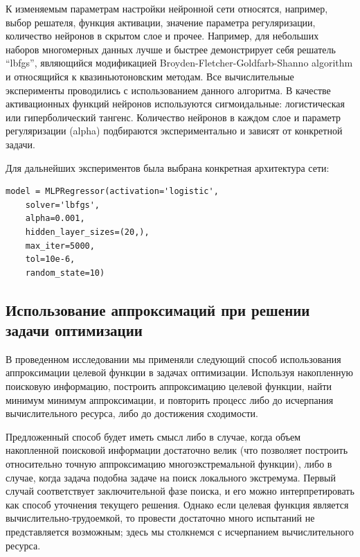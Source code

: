 \documentclass[sensors,article,submit,moreauthors,pdftex]{Definitions/mdpi}
\begin{document}
К изменяемым параметрам настройки нейронной сети относятся, например, выбор решателя, функция активации, значение параметра регуляризации, количество нейронов в скрытом слое и прочее.
Например, для небольших наборов многомерных данных лучше и быстрее демонстрирует себя решатель ``lbfgs'', являющийся модификацией Broyden-Fletcher-Goldfarb-Shanno algorithm \cite{Nocedal2006} и относящийся к квазиньютоновским методам. Все вычислительные эксперименты проводились с использованием данного алгоритма.
В качестве активационных функций нейронов используются сигмоидальные: логистическая или гиперболический тангенс. 
Количество нейронов в каждом слое и параметр регуляризации (alpha) подбираются экспериментально и зависят от конкретной задачи. 

Для дальнейших экспериментов была выбрана конкретная архитектура сети: 
\begin{verbatim}
model = MLPRegressor(activation='logistic',
	solver='lbfgs',
	alpha=0.001,
	hidden_layer_sizes=(20,),
	max_iter=5000,
	tol=10e-6,
	random_state=10)
\end{verbatim}


\subsection{Использование аппроксимаций при решении задачи оптимизации}

В проведенном исследовании мы применяли следующий способ использования аппроксимации целевой функции в задачах оптимизации. Используя накопленную поисковую информацию, построить аппроксимацию целевой функции, найти минимум минимум аппроксимации, и повторить процесс либо до исчерпания вычислительного ресурса, либо до достижения сходимости.

Предложенный способ будет иметь смысл либо в случае, когда объем накопленной поисковой информации достаточно велик (что позволяет построить относительно точную аппроксимацию многоэкстремальной функции), либо в случае, когда задача подобна задаче на поиск локального экстремума. 
Первый случай соответствует заключительной фазе поиска, и его можно интерпретировать как способ уточнения текущего решения. Однако если целевая функция является вычислительно-трудоемкой, то провести достаточно много испытаний не представляется возможным; здесь мы столкнемся с исчерпанием вычислительного ресурса.
\end{document}
